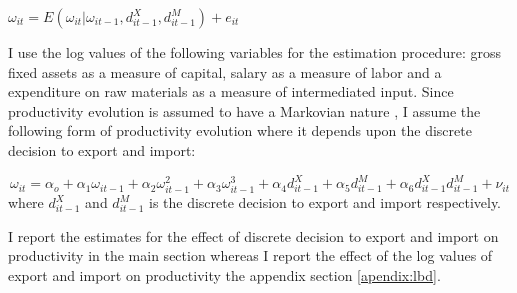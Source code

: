 \documentclass[12pt]{article}
\begin{document}
$\omega_{it} =
  E(\omega_{it}| \omega_{it-1}, d_{it-1}^{X}, d_{it-1}^{M}) + e_{it}$





I use the log values of the following variables for the estimation
procedure:  gross fixed assets as a measure of capital, salary
as a measure of labor and a expenditure on raw materials as a measure
of intermediated input. Since productivity evolution is  assumed to
have a Markovian nature , I assume the following form of productivity
evolution where it depends upon  the discrete decision to export and import:

\begin{equation}
 \omega_{it} = \alpha_{o} + \alpha_{1}\omega_{it-1} +
\alpha_{2}\omega_{it-1}^{2} + \alpha_{3}\omega_{it-1}^{3}+
\alpha_{4}d_{it-1}^{X} + \alpha_{5} d_{it-1}^{M} +
\alpha_{6}d_{it-1}^{X}d_{it-1}^{M}  + \nu_{it}
\end{equation} 
where $d_{it-1}^{X}$ and $d_{it-1}^{M}$ is the discrete decision to
export and import respectively. 

I report the estimates for the effect of discrete decision to export
and import on productivity in the main section whereas I report the
effect of the log values of export and import on productivity the
appendix section \ref{apendix:lbd}.  
\end{document}
